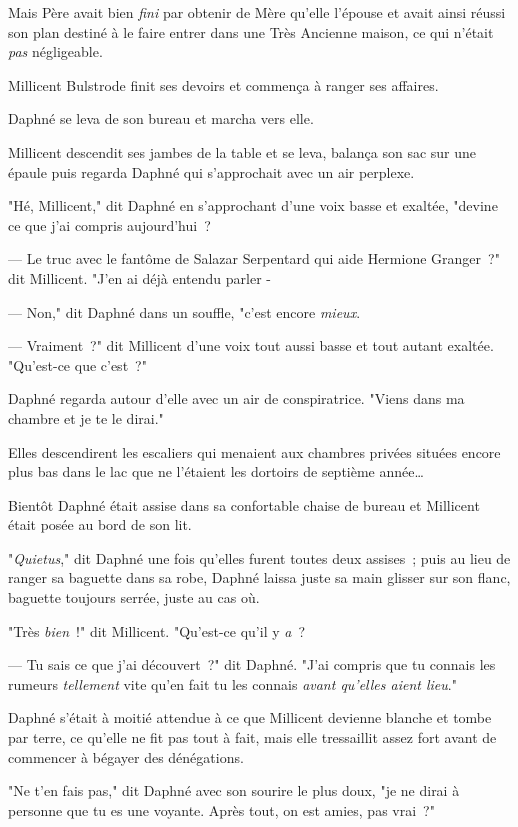 Mais Père avait bien \emph{fini} par obtenir de Mère qu'elle l'épouse et avait ainsi réussi son plan destiné à le faire entrer dans une Très Ancienne maison, ce qui n'était \emph{pas} négligeable.

Millicent Bulstrode finit ses devoirs et commença à ranger ses affaires.

Daphné se leva de son bureau et marcha vers elle.

Millicent descendit ses jambes de la table et se leva, balança son sac sur une épaule puis regarda Daphné qui s'approchait avec un air perplexe.

"Hé, Millicent," dit Daphné en s'approchant d'une voix basse et exaltée, "devine ce que j'ai compris aujourd'hui~?

--- Le truc avec le fantôme de Salazar Serpentard qui aide Hermione Granger~?" dit Millicent. "J'en ai déjà entendu parler -

--- Non," dit Daphné dans un souffle, "c'est encore \emph{mieux}.

--- Vraiment~?" dit Millicent d'une voix tout aussi basse et tout autant exaltée. "Qu'est-ce que c'est~?"

Daphné regarda autour d'elle avec un air de conspiratrice. "Viens dans ma chambre et je te le dirai."

Elles descendirent les escaliers qui menaient aux chambres privées situées encore plus bas dans le lac que ne l'étaient les dortoirs de septième année…

Bientôt Daphné était assise dans sa confortable chaise de bureau et Millicent était posée au bord de son lit.

"\emph{Quietus}," dit Daphné une fois qu'elles furent toutes deux assises~; puis au lieu de ranger sa baguette dans sa robe, Daphné laissa juste sa main glisser sur son flanc, baguette toujours serrée, juste au cas où.

"Très \emph{bien}~!" dit Millicent. "Qu'est-ce qu'il y \emph{a}~?

--- Tu sais ce que j'ai découvert~?" dit Daphné. "J'ai compris que tu connais les rumeurs \emph{tellement} vite qu'en fait tu les connais \emph{avant qu'elles aient lieu}."

Daphné s'était à moitié attendue à ce que Millicent devienne blanche et tombe par terre, ce qu'elle ne fit pas tout à fait, mais elle tressaillit assez fort avant de commencer à bégayer des dénégations.

"Ne t'en fais pas," dit Daphné avec son sourire le plus doux, "je ne dirai à personne que tu es une voyante. Après tout, on est amies, pas vrai~?"

